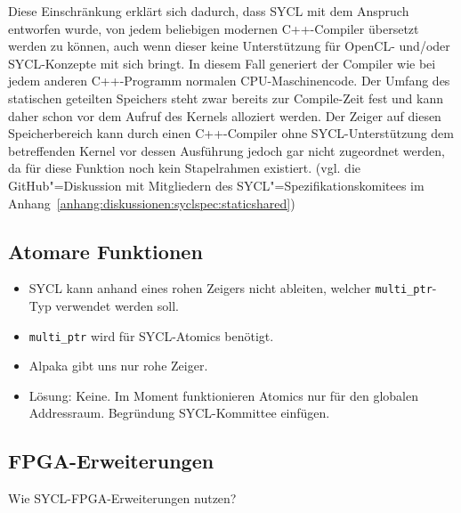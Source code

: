 Diese Einschränkung erklärt sich dadurch, dass SYCL mit dem Anspruch entworfen
wurde, von jedem beliebigen modernen C++-Compiler übersetzt werden zu können,
auch wenn dieser keine Unterstützung für OpenCL- und/oder SYCL-Konzepte mit sich
bringt. In diesem Fall generiert der Compiler wie bei jedem anderen C++-Programm
normalen CPU-Maschinencode. Der Umfang des statischen geteilten Speichers steht
zwar bereits zur Compile-Zeit fest und kann daher schon vor dem Aufruf des
Kernels alloziert werden. Der Zeiger auf diesen Speicherbereich kann durch einen
C++-Compiler ohne SYCL-Unterstützung dem betreffenden Kernel vor dessen
Ausführung jedoch gar nicht zugeordnet werden, da für diese Funktion noch kein
Stapelrahmen existiert. (vgl. die GitHub"=Diskussion mit Mitgliedern des
SYCL"=Spezifikationskomitees im
Anhang~\ref{anhang:diskussionen:syclspec:staticshared})

\subsection{Atomare Funktionen}\label{implementierung:probleme:atomics}

\begin{itemize}
    \item SYCL kann anhand eines rohen Zeigers nicht ableiten, welcher
          \texttt{multi\_ptr}-Typ verwendet werden soll.
    \item \texttt{multi\_ptr} wird für SYCL-Atomics benötigt.
    \item Alpaka gibt uns nur rohe Zeiger.
    \item Lösung: Keine. Im Moment funktionieren Atomics nur für den globalen
          Addressraum. Begründung SYCL-Kommittee einfügen.
\end{itemize}

\subsection{FPGA-Erweiterungen}\label{implementierung:probleme:fpga}

Wie SYCL-FPGA-Erweiterungen nutzen?
